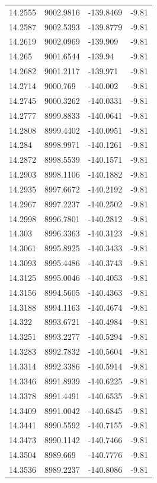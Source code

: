 \begin{table}[H]
\begin{tabular}{llll}
14.2555 & 9002.9816 & -139.8469 & -9.81 \\
14.2587 & 9002.5393 & -139.8779 & -9.81 \\
14.2619 & 9002.0969 & -139.909 & -9.81 \\
14.265 & 9001.6544 & -139.94 & -9.81 \\
14.2682 & 9001.2117 & -139.971 & -9.81 \\
14.2714 & 9000.769 & -140.002 & -9.81 \\
14.2745 & 9000.3262 & -140.0331 & -9.81 \\
14.2777 & 8999.8833 & -140.0641 & -9.81 \\
14.2808 & 8999.4402 & -140.0951 & -9.81 \\
14.284 & 8998.9971 & -140.1261 & -9.81 \\
14.2872 & 8998.5539 & -140.1571 & -9.81 \\
14.2903 & 8998.1106 & -140.1882 & -9.81 \\
14.2935 & 8997.6672 & -140.2192 & -9.81 \\
14.2967 & 8997.2237 & -140.2502 & -9.81 \\
14.2998 & 8996.7801 & -140.2812 & -9.81 \\
14.303 & 8996.3363 & -140.3123 & -9.81 \\
14.3061 & 8995.8925 & -140.3433 & -9.81 \\
14.3093 & 8995.4486 & -140.3743 & -9.81 \\
14.3125 & 8995.0046 & -140.4053 & -9.81 \\
14.3156 & 8994.5605 & -140.4363 & -9.81 \\
14.3188 & 8994.1163 & -140.4674 & -9.81 \\
14.322 & 8993.6721 & -140.4984 & -9.81 \\
14.3251 & 8993.2277 & -140.5294 & -9.81 \\
14.3283 & 8992.7832 & -140.5604 & -9.81 \\
14.3314 & 8992.3386 & -140.5914 & -9.81 \\
14.3346 & 8991.8939 & -140.6225 & -9.81 \\
14.3378 & 8991.4491 & -140.6535 & -9.81 \\
14.3409 & 8991.0042 & -140.6845 & -9.81 \\
14.3441 & 8990.5592 & -140.7155 & -9.81 \\
14.3473 & 8990.1142 & -140.7466 & -9.81 \\
14.3504 & 8989.669 & -140.7776 & -9.81 \\
14.3536 & 8989.2237 & -140.8086 & -9.81 \\

\end{tabular}
\end{table}
